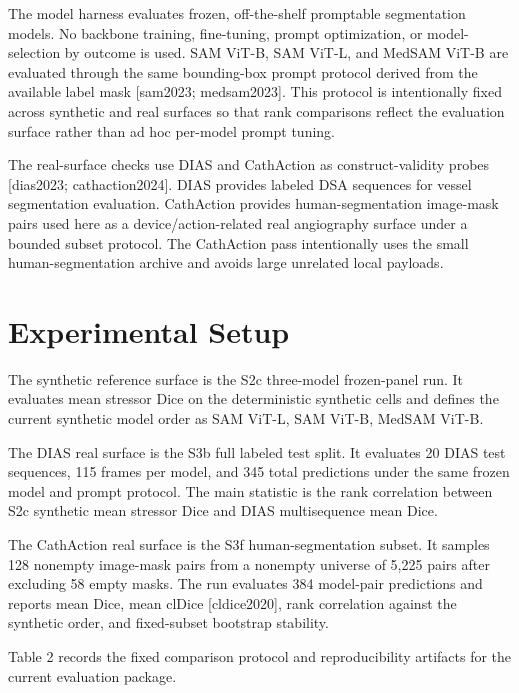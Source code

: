 \documentclass[11pt]{article}
\begin{document}
The model harness evaluates frozen, off-the-shelf promptable segmentation models. No backbone training, fine-tuning, prompt optimization, or model-selection by outcome is used. SAM ViT-B, SAM ViT-L, and MedSAM ViT-B are evaluated through the same bounding-box prompt protocol derived from the available label mask \textup{[sam2023; medsam2023]}. This protocol is intentionally fixed across synthetic and real surfaces so that rank comparisons reflect the evaluation surface rather than ad hoc per-model prompt tuning.


The real-surface checks use DIAS and CathAction as construct-validity probes \textup{[dias2023; cathaction2024]}. DIAS provides labeled DSA sequences for vessel segmentation evaluation. CathAction provides human-segmentation image-mask pairs used here as a device/action-related real angiography surface under a bounded subset protocol. The CathAction pass intentionally uses the small human-segmentation archive and avoids large unrelated local payloads.


\section*{Experimental Setup}

The synthetic reference surface is the S2c three-model frozen-panel run. It evaluates mean stressor Dice on the deterministic synthetic cells and defines the current synthetic model order as SAM ViT-L, SAM ViT-B, MedSAM ViT-B.


The DIAS real surface is the S3b full labeled test split. It evaluates 20 DIAS test sequences, 115 frames per model, and 345 total predictions under the same frozen model and prompt protocol. The main statistic is the rank correlation between S2c synthetic mean stressor Dice and DIAS multisequence mean Dice.


The CathAction real surface is the S3f human-segmentation subset. It samples 128 nonempty image-mask pairs from a nonempty universe of 5,225 pairs after excluding 58 empty masks. The run evaluates 384 model-pair predictions and reports mean Dice, mean clDice \textup{[cldice2020]}, rank correlation against the synthetic order, and fixed-subset bootstrap stability.


Table 2 records the fixed comparison protocol and reproducibility artifacts for the current evaluation package.
\end{document}
